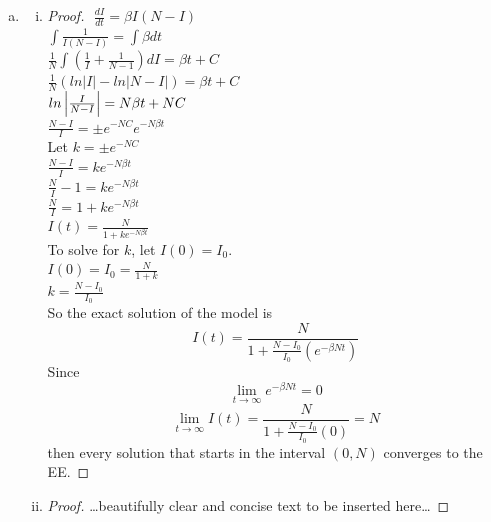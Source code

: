\documentclass[12pt]{article}
\begin{document}
\begin{enumerate}[(a)]
\item \SIanalQb
  \begin{enumerate}[(i)]
  \item \SIanalQbi

    {\color{blue}
      \begin{proof}
        $ $\newline
      	$\frac{dI}{dt} = \beta I(N-I)$\\
      	$\int\frac{1}{I(N-I)} = \int\beta dt$\\
      	$\frac{1}{N}\int (\frac{1}{I} + \frac{1}{N-1})dI = \beta t + C$\\
      	$\frac{1}{N}(ln|I|- ln|N-I|) =\beta t + C$\\
      	$ln\left|\frac{I}{N-I}\right| = N \beta t + NC$\\
      	$\frac{N-I}{I} = \pm e^{-NC}e^{-N\beta t}$\\
      	
      	Let $k = \pm e^{-NC}$\\
      	$\frac{N-I}{I} = ke^{-N\beta t}$\\
      	$\frac{N}{I} - 1 = ke^{-N\beta t}$\\
      	$\frac{N}{I} = 1 + ke^{-N\beta t}$\\
      	$I(t) = \frac{N}{1 + ke^{-N\beta t}}$\\      	
      	
      	To solve for $k$, let $I(0) = I_0$.\\
      	$I(0) = I_0 = \frac{N}{1 + k}$\\ 
      	$k = \frac{N - I_0}{I_0}$\\
      	
        So the exact solution of the model is
        \begin{equation}
          I(t) =  \frac{N}{1+\frac{N-I_0}{I_0}(e^{-\beta N t})}
        \end{equation}
        Since $$\lim_{t\to\infty} e^{-\beta N t} = 0$$
       $$\lim_{t\to\infty} I(t) = \frac{N}{1 +\frac{N-I_0}{I_0}(0)} = N$$
       then every solution that starts in the interval $(0, N)$ converges to the EE. 
      \end{proof}
    }

  \item \SIanalQbii

    {\color{blue}
      \begin{proof}
        {\color{magenta}\dots beautifully clear and concise text to be inserted here\dots}
      \end{proof}
    }

  \end{enumerate}
\end{enumerate}
\end{document}
